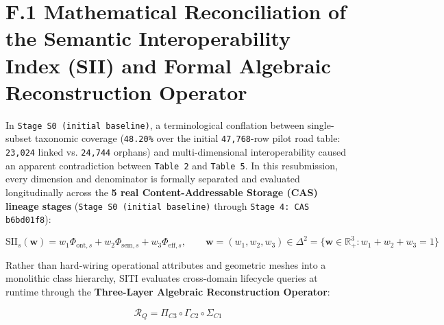 \documentclass[10pt,a4paper]{article}
\begin{document}
\section*{F.1 Mathematical Reconciliation of the Semantic Interoperability Index (SII) and Formal Algebraic Reconstruction Operator}

In \texttt{Stage S0 (initial baseline)}, a terminological conflation between single-subset taxonomic coverage (\texttt{48.20\%} over the initial \texttt{47,768}-row pilot road table: \texttt{23,024} linked vs. \texttt{24,744} orphans) and multi-dimensional interoperability caused an apparent contradiction between \texttt{Table 2} and \texttt{Table 5}. In this resubmission, every dimension and denominator is formally separated and evaluated longitudinally across the \textbf{5 real Content-Addressable Storage (CAS) lineage stages} (\texttt{Stage S0 (initial baseline)} through \texttt{Stage 4: CAS b6bd01f8}):

\begin{equation*}
\text{SII}_s(\mathbf{w}) = w_1 \Phi_{\text{ont}, s} + w_2 \Phi_{\text{sem}, s} + w_3 \Phi_{\text{eff}, s}, \qquad \mathbf{w} = (w_1, w_2, w_3) \in \Delta^2 = \{ \mathbf{w} \in \mathbb{R}_+^3 : w_1 + w_2 + w_3 = 1 \}
\end{equation*}

Rather than hard-wiring operational attributes and geometric meshes into a monolithic class hierarchy, SITI evaluates cross-domain lifecycle queries at runtime through the \textbf{Three-Layer Algebraic Reconstruction Operator}:

\begin{equation*}
\mathcal{R}_Q = \Pi_{C3} \circ \Gamma_{C2} \circ \Sigma_{C1}
\end{equation*}
\end{document}
